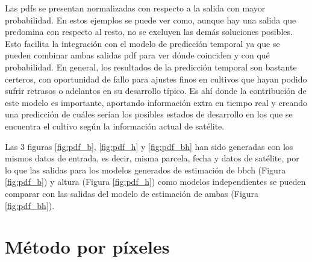 \par Las \gls{pdf}s se presentan normalizadas con respecto a la salida con mayor probabilidad. En estos ejemplos se puede ver como, aunque hay una salida que predomina con respecto al resto, no se excluyen las demás soluciones posibles. Esto facilita la integración con el modelo de predicción temporal ya que se pueden combinar ambas salidas \gls{pdf} para ver dónde coinciden y con qué probabilidad. En general, los resultados de la predicción temporal son bastante certeros, con oportunidad de fallo para ajustes finos en cultivos que hayan podido sufrir retrasos o adelantos en su desarrollo típico. Es ahí donde la contribución de este modelo es importante, aportando información extra en tiempo real y creando una predicción de cuáles serían los posibles estados de desarrollo en los que se encuentra el cultivo según la información actual de satélite. 
\\
\par Las 3 figuras \ref{fig:pdf_b}, \ref{fig:pdf_h} y \ref{fig:pdf_bh} han sido generadas con los mismos datos de entrada, es decir, misma parcela, fecha y datos de satélite, por lo que las salidas para los modelos generados de estimación de \gls{bbch} (Figura \ref{fig:pdf_b}) y altura (Figura \ref{fig:pdf_h}) como modelos independientes se pueden comparar con las salidas del modelo de estimación de ambas (Figura \ref{fig:pdf_bh}). 





\section{Método por píxeles} 
